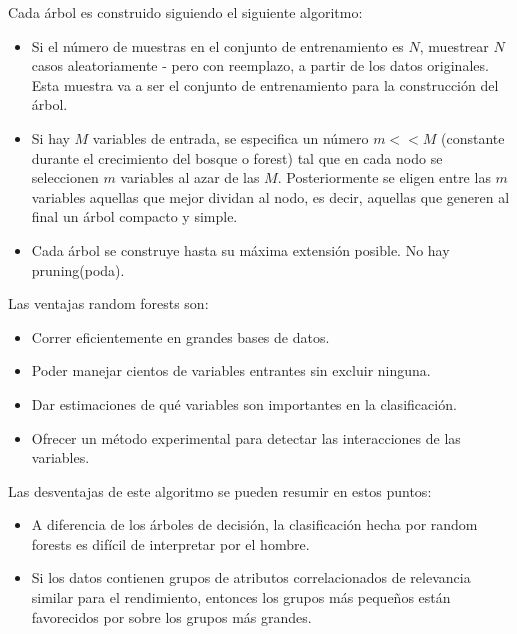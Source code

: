 	Cada árbol es construido siguiendo el siguiente algoritmo:
	\begin{itemize}
		\item Si el número de muestras en el conjunto de entrenamiento es $N$, muestrear $N$ casos aleatoriamente - pero con reemplazo, a partir de los datos originales. Esta muestra va a ser el conjunto de entrenamiento para la construcción del árbol.
		\item Si hay $M$ variables de entrada, se especifica un número $m<<M$ (constante durante el crecimiento del bosque o forest) tal que en cada nodo se seleccionen $m$ variables al azar de las $M$. Posteriormente se eligen entre las $m$ variables aquellas que mejor dividan al nodo, es decir, aquellas que generen al final un árbol compacto y simple.
		\item Cada árbol se construye hasta su máxima extensión posible. No hay pruning(poda).
	\end{itemize}
	Las ventajas random forests son:
	\begin{itemize}
		\item Correr eficientemente en grandes bases de datos.
		\item Poder manejar cientos de variables entrantes sin excluir ninguna.
		\item Dar estimaciones de qué variables son importantes en la clasificación.
		\item Ofrecer un método experimental para detectar las interacciones de las variables.
	\end{itemize}
	Las desventajas de este algoritmo se pueden resumir en estos puntos:
	\begin{itemize}
		\item A diferencia de los árboles de decisión, la clasificación hecha por random forests es difícil de interpretar por el hombre.
		\item Si los datos contienen grupos de atributos correlacionados de relevancia similar para el rendimiento, entonces los grupos más pequeños están favorecidos por sobre los grupos más grandes.
	\end{itemize}